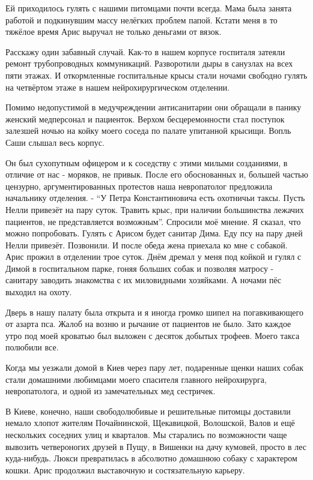 Ей приходилось гулять с нашими питомцами почти всегда. Мама была занята работой
и подкинувшим массу нелёгких проблем папой. Кстати меня в то тяжёлое время Арис
выручал не только деньгами от вязок. 

Расскажу один забавный случай. Как-то в нашем корпусе госпиталя затеяли ремонт
трубопроводных коммуникаций. Разворотили дыры в санузлах на всех пяти этажах. И
откормленные госпитальные крысы стали ночами свободно гулять на четвёртом этаже
в нашем нейрохирургическом отделении.

Помимо недопустимой в медучреждении антисанитарии они обращали в панику женский
медперсонал и пациенток. Верхом бесцеремонности стал поступок залезшей ночью на
койку моего соседа по палате упитанной крысищи. Вопль Саши слышал весь корпус.

Он был сухопутным офицером и к соседству с этими милыми созданиями, в отличие
от нас - моряков, не привык. После его обоснованных и, большей частью цензурно,
аргументированных протестов наша невропатолог предложила начальнику отделения.
- \enquote{У Петра Константиновича есть охотничьи таксы. Пусть Нелли привезёт
на пару суток. Травить крыс, при наличии большинства лежачих пациентов, не
представляется возможным}. Спросили моё мнение. Я сказал, что можно
попробовать. Гулять с Арисом будет санитар Дима. Еду псу на пару дней Нелли
привезёт. Позвонили. И после обеда жена приехала ко мне с собакой. Арис прожил
в отделении трое суток. Днём дремал у меня под койкой и гулял с Димой в
госпитальном парке, гоняя больших собак и позволяя матросу - санитару заводить
знакомства с их миловидными хозяйками. А ночами пёс выходил на охоту. 

Дверь в нашу палату была открыта и я иногда громко шипел на погавкивающего от
азарта пса. Жалоб на возню и рычание от пациентов не было. Зато каждое утро под
моей кроватью был выложен с десяток добытых трофеев. Моего такса полюбили все. 

Когда мы уезжали домой в Киев через пару лет, подаренные щенки наших собак
стали домашними любимцами моего спасителя главного нейрохирурга, невропатолога,
и одной из замечательных мед сестричек. 

В Киеве, конечно, наши свободолюбивые и решительные питомцы доставили немало
хлопот жителям Почайнинской, Щекавицкой, Волошской, Валов и ещё нескольких
соседних улиц и кварталов. Мы старались по возможности чаще вывозить
четвероногих друзей в Пущу, в Вишенки на дачу кумовей, просто в лес
куда-нибудь. Люкси превратилась в абсолютно домашнюю собаку с характером кошки.
Арис продолжил выставочную и состязательную карьеру.

